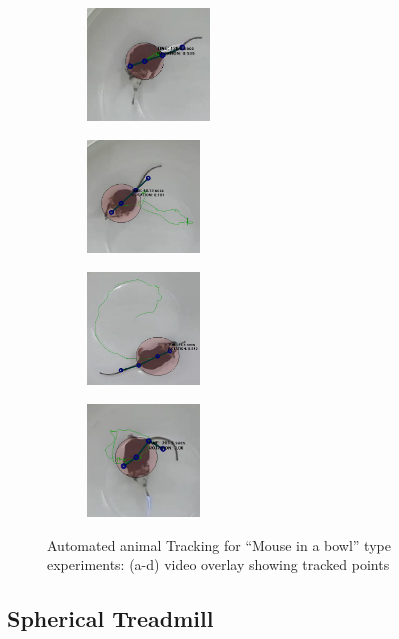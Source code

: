 \begin{figure}[htb]
	\begin{subfigure}[t]{0.24\linewidth}\centering
		\includegraphics[height=3cm]{figures/07mousedata1close.jpg}
		\caption{}
	\end{subfigure}
	\hfill
	\begin{subfigure}[t]{0.24\linewidth}\centering
		\includegraphics[width=3cm]{figures/06mousedata1.jpg}
		\caption{}
	\end{subfigure}
	\begin{subfigure}[t]{0.24\linewidth}\centering
		\includegraphics[width=3cm]{figures/08mousedata2.jpg}
		\caption{}
	\end{subfigure}
	\begin{subfigure}[t]{0.24\linewidth}\centering
		\includegraphics[width=3cm]{figures/09mousedata1fiberon1.jpg}
		\caption{}
	\end{subfigure}
	\caption{
		Automated animal Tracking for ``Mouse in a bowl'' type experiments: (a-d) video overlay showing tracked points} \label{fig:mouse-in-bowl-2}
\end{figure}

\subsection{Spherical Treadmill}\label{sec:spherical-treadmill}

